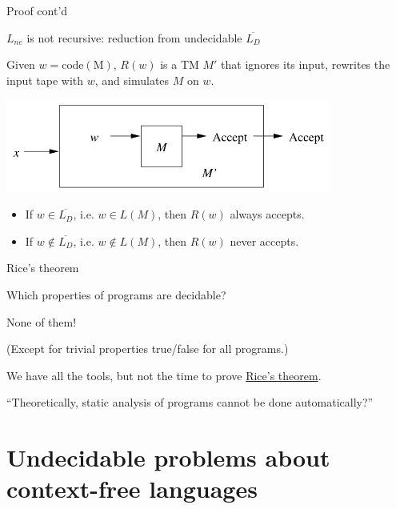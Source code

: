 \documentclass[handout]{beamer}
\begin{document}
\begin{frame}{Proof cont'd}

    \alert{$L_{ne}$ is not recursive:} reduction from undecidable $\overline{L_D}$

    Given $w=\mathrm{code(M)}$, $R(w)$ is a TM $M'$ that ignores its input, rewrites the input tape with $w$, and simulates $M$ on $w$. 

    \begin{center}
        \includegraphics[width=0.8\textwidth]{files/Lne2.PNG}
    \end{center}
    
    \begin{itemize}
        \item If $w\in\overline{L_D}$, i.e. $w\in L(M)$, then $R(w)$ always accepts.
        \item If $w\notin\overline{L_D}$, i.e. $w\notin L(M)$, then $R(w)$ never accepts.\hfill\qedsymbol
    \end{itemize}

\end{frame}


\begin{frame}{Rice's theorem}

    Which properties of programs are decidable?

    \bigskip

    None of them!

    \bigskip

    (Except for trivial properties true/false for all programs.)

    \bigskip

    We have all the tools, but not the time to prove \href{https://en.wikipedia.org/wiki/Rice\%27s\_theorem}{\alert{Rice's theorem}}.

    \bigskip

    ``Theoretically, static analysis of programs cannot be done automatically?''

\end{frame}


\section*{Undecidable problems about context-free languages}
\end{document}
